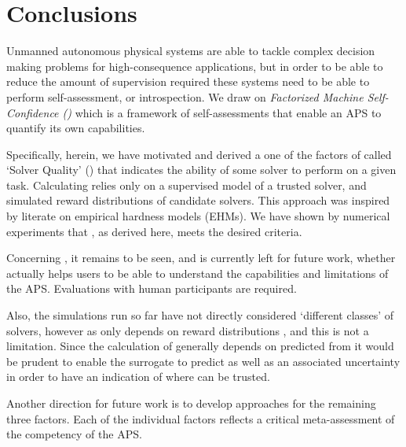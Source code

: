 \section{Conclusions} \label{sec:conclusions}
Unmanned autonomous physical systems are able to tackle complex decision making problems for high-consequence applications, but in order to be able to reduce the amount of supervision required these systems need to be able to perform self-assessment, or introspection. We draw on \emph{Factorized Machine Self-Confidence (\famsec)} which is a framework of self-assessments that enable an APS to quantify its own capabilities.

Specifically, herein, we have motivated and derived a one of the factors of \famsec{} called `Solver Quality' (\xQ) that indicates the ability of some solver to perform on a given task. Calculating \xQ{} relies only on a supervised model of a trusted solver, and simulated reward distributions of candidate solvers. This approach was inspired by literate on empirical hardness models (EHMs). We have shown by numerical experiments that \xQ{}, as derived here, meets the desired criteria.

Concerning \xQ{}, it remains to be seen, and is currently left for future work, whether \xQ{} actually helps users to be able to understand the capabilities and limitations of the APS. Evaluations with human participants are required.

Also, the simulations run so far have not directly considered `different classes' of solvers, however as \xQ{} only depends on reward distributions \rwd{}, and \rwdstar{} this is not a limitation. Since the calculation of \xQ{} generally depends on \rwdstar{} predicted from \surrogate{} it would be prudent to enable the surrogate to predict \rwdstar{} as well as an associated uncertainty in order to have an indication of where \surrogate{} can be trusted.

Another direction for future work is to develop approaches for the remaining three \famsec{} factors. Each of the individual factors reflects a critical meta-assessment of the competency of the APS.